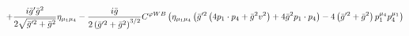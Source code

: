%
\begin{dmath*}
%
  +  \frac{i {\bar g}^\prime {\bar g}{}^2}{2 \sqrt{{\bar g}^{\prime 2} + {\bar g}{}^2}}\eta_{\mu_1 \mu_4}  -  \frac{i {\bar g}{}}{2 \left({\bar g}^{\prime 2} + {\bar g}{}^2\right)^{3/2}}C^{ \varphi  WB} \left(\eta_{\mu_1 \mu_4} \left({\bar g}^{\prime 2} \left(4 p_{1}\nobreak\cdot\nobreak{}p_{4} + {\bar g}{}^2 v^2\right) + 4 {\bar g}{}^2 p_{1}\nobreak\cdot\nobreak{}p_{4}\right) - 4 \left({\bar g}^{\prime 2} + {\bar g}{}^2\right) p_1^{\mu_4} p_4^{\mu_1}\right)
%
\end{dmath*}
%
